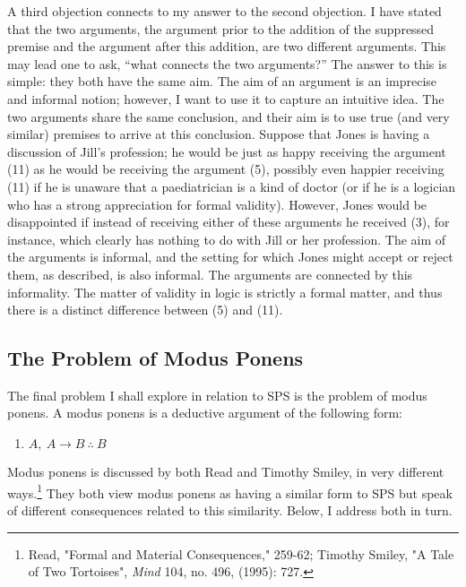 A third objection connects to my answer to the second objection. I have
stated that the two arguments, the argument prior to the addition of the
suppressed premise and the argument after this addition, are two
different arguments. This may lead one to ask, ``what connects the two
arguments?'' The answer to this is simple: they both have the same aim.
The aim of an argument is an imprecise and informal notion; however, I
want to use it to capture an intuitive idea. The two arguments share the
same conclusion, and their aim is to use true (and very similar)
premises to arrive at this conclusion. Suppose that Jones is having a
discussion of Jill's profession; he would be just as happy receiving the
argument (11) as he would be receiving the argument (5), possibly even
happier receiving (11) if he is unaware that a paediatrician is a kind
of doctor (or if he is a logician who has a strong appreciation for
formal validity). However, Jones would be disappointed if instead of
receiving either of these arguments he received (3), for instance, which
clearly has nothing to do with Jill or her profession. The aim of the
arguments is informal, and the setting for which Jones might accept or
reject them, as described, is also informal. The arguments are connected
by this informality. The matter of validity in logic is strictly a
formal matter, and thus there is a distinct difference between (5) and
(11).

\subsection*{The Problem of Modus Ponens}

The final problem I shall explore in relation to SPS is the problem of
modus ponens. A modus ponens is a deductive argument of the following
form:

\begin{enumerate}[leftmargin=42] 
\def\labelenumi{(\arabic{enumi})}
\setcounter{enumi}{15}
\item
  $A, \ A \rightarrow B \ \therefore \ B$
\end{enumerate}

\noindent Modus ponens is discussed by both Read and Timothy Smiley, in very
different ways.\footnote{Read, "Formal and Material Consequences,"
  259-62; Timothy Smiley, "A Tale of Two Tortoises", \emph{Mind} 104,
  no. 496, (1995): 727.} They both view modus ponens as having a similar
form to SPS but speak of different consequences related to this
similarity. Below, I address both in turn.


